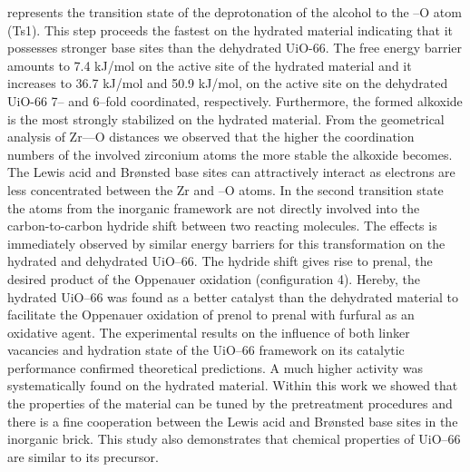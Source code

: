 represents the transition state of the deprotonation of the alcohol to the
--O atom (Ts1). This step proceeds the fastest on the hydrated
material indicating that it possesses stronger base sites than the dehydrated
UiO-66. The free energy barrier amounts to 7.4 kJ/mol on the active site of the
hydrated material and it increases to 36.7 kJ/mol and 50.9 kJ/mol, on the active
site on the dehydrated UiO-66 7-- and 6--fold coordinated, respectively.
Furthermore, the formed alkoxide is the most strongly stabilized on the hydrated material. From the geometrical analysis of Zr----O distances we observed that the higher the coordination numbers of the involved
zirconium atoms the more stable the alkoxide becomes. The Lewis acid and
Br\o{}nsted base sites can attractively interact as electrons are less
concentrated between the Zr and --O atoms. In the second
transition state the atoms from the inorganic framework are not directly
involved into the carbon-to-carbon hydride shift between two reacting molecules.
The effects is immediately observed by similar energy barriers for this
transformation on the hydrated and dehydrated UiO--66. The
hydride shift gives rise to prenal, the desired product of the
Oppenauer oxidation (configuration 4). Hereby, the hydrated UiO--66 was found as
a better catalyst than the dehydrated material to facilitate the Oppenauer
oxidation of prenol to prenal with furfural as an oxidative agent. The experimental results
on the influence of both linker vacancies and hydration state of the UiO--66 framework on its catalytic performance confirmed theoretical predictions. A much higher activity was systematically found on the hydrated material. Within this work we showed that the properties of the material can be tuned by the pretreatment procedures and there is a fine cooperation between the Lewis acid and Br\o{}nsted base sites in
the inorganic brick. This study also demonstrates that chemical properties of
UiO--66 are similar to its  precursor.

